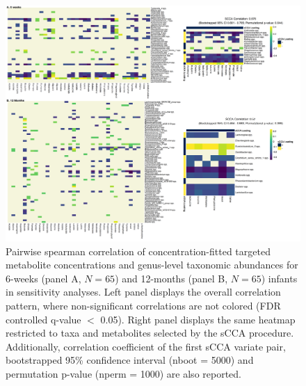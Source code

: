 \begin{figure}[!h]
    \centering
    \includegraphics[width=0.95\linewidth]{figures/appB_fs7.png}
    \caption[Pairwise spearman correlation of concentration-fitted targeted metabolite concentrations and genus-level taxonomic abundances for 6-weeks (panel A, $N = 65$) and 12-months (panel B, $N = 65$) infants in sensitivity analyses]{Pairwise spearman correlation of concentration-fitted targeted metabolite concentrations and genus-level taxonomic abundances for 6-weeks (panel A, $N = 65$) and 12-months (panel B, $N = 65$) infants in sensitivity analyses. Left panel displays the overall correlation pattern, where non-significant correlations are not colored (FDR controlled q-value $<$ 0.05). Right panel displays the same heatmap restricted to taxa and metabolites selected by the sCCA procedure. Additionally, correlation coefficient of the first sCCA variate pair, bootstrapped 95\% confidence interval (nboot = 5000) and permutation p-value (nperm = 1000) are also reported.}
    \label{fig:b7}
\end{figure}

